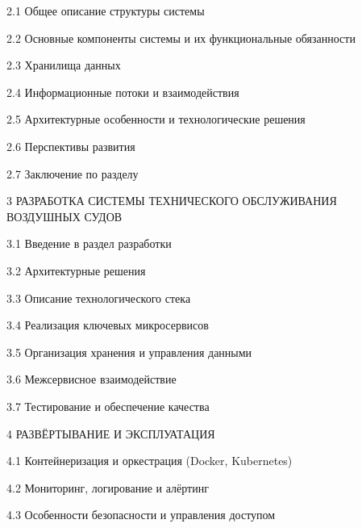 \documentclass[14pt,a4paper]{extarticle}
\begin{document}
\begin{flushleft}
\hspace{0.63cm}2.1 Общее описание структуры системы 

\hspace{0.63cm}2.2 Основные компоненты системы и их функциональные обязанности 

\hspace{0.63cm}2.3 Хранилища данных 

\hspace{0.63cm}2.4 Информационные потоки и взаимодействия 

\hspace{0.63cm}2.5 Архитектурные особенности и технологические решения 

\hspace{0.63cm}2.6 Перспективы развития 

\hspace{0.63cm}2.7 Заключение по разделу 

3 РАЗРАБОТКА СИСТЕМЫ ТЕХНИЧЕСКОГО ОБСЛУЖИВАНИЯ ВОЗДУШНЫХ СУДОВ 

\hspace{0.63cm}3.1 Введение в раздел разработки 

\hspace{0.63cm}3.2 Архитектурные решения 

\hspace{0.63cm}3.3 Описание технологического стека 

\hspace{0.63cm}3.4 Реализация ключевых микросервисов 

\hspace{0.63cm}3.5 Организация хранения и управления данными 

\hspace{0.63cm}3.6 Межсервисное взаимодействие 

\hspace{0.63cm}3.7 Тестирование и обеспечение качества 

4 РАЗВЁРТЫВАНИЕ И ЭКСПЛУАТАЦИЯ 

\hspace{0.63cm}4.1 Контейнеризация и оркестрация (Docker, Kubernetes) 

\hspace{0.63cm}4.2 Мониторинг, логирование и алёртинг 

\hspace{0.63cm}4.3 Особенности безопасности и управления доступом 


\end{flushleft}
\end{document}
